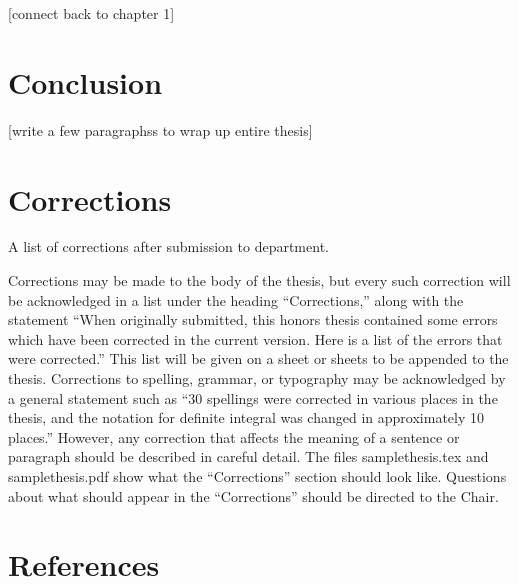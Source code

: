 \documentclass[12pt, twoside]{amherstthesis}
\begin{document}
{[}connect back to chapter 1{]}

\hypertarget{conclusion}{%
\chapter{Conclusion}\label{conclusion}}

{[}write a few paragraphss to wrap up entire thesis{]}

\hypertarget{corrections}{%
\chapter*{Corrections}\label{corrections}}

A list of corrections after submission to department.

Corrections may be made to the body of the thesis, but every such correction will be acknowledged in a list under the heading ``Corrections,'' along with the statement ``When originally submitted, this honors thesis contained some errors which have been corrected in the current version. Here is a list of the errors that were corrected.'' This list will be given on a sheet or sheets to be appended to the thesis. Corrections to spelling, grammar, or typography may be acknowledged by a general statement such as ``30 spellings were corrected in various places in the thesis, and the notation for definite integral was changed in approximately 10 places.'' However, any correction that affects the meaning of a sentence or paragraph should be described in careful detail. The files samplethesis.tex and samplethesis.pdf show what the ``Corrections'' section should look like. Questions about what should appear in the ``Corrections'' should be directed to the Chair.

\backmatter

\hypertarget{references}{%
\chapter*{References}\label{references}}

\noindent

\setlength{\parindent}{-0.20in}
\setlength{\leftskip}{0.20in}
\setlength{\parskip}{8pt}
\end{document}
